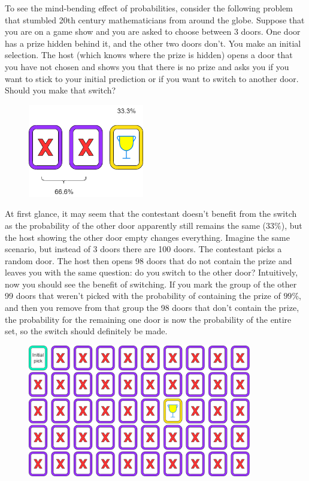 \documentclass[letterpaper]{article}
\begin{document}
To see the mind-bending effect of probabilities, consider the following problem that stumbled 20th century mathematicians from around the globe. Suppose that you are on a game show and you are asked to choose between 3 doors. One door has a prize hidden behind it, and the other two doors don't. You make an initial selection. The host (which knows where the prize is hidden) opens a door that you have not chosen and shows you that there is no prize and asks you if you want to stick to your initial prediction or if you want to switch to another door. Should you make that switch?

\newpage


\begin{figure} [h!]
\centering
\includegraphics[width=0.45\textwidth]{pngOfDiagrams/montyhall3.png}
\end{figure}

At first glance, it may seem that the contestant doesn't benefit from the switch as the probability of the other door apparently still remains the same ($33\%$), but the host showing the other door empty changes everything. Imagine the same scenario, but instead of 3 doors there are 100 doors. The contestant picks a random door. The host then opens 98 doors that do not contain the prize and leaves you with the same question: do you switch to the other door? Intuitively, now you should see the benefit of switching. If you mark the group of the other 99 doors that weren't picked with the probability of containing the prize of $99\%$, and then you remove from that group the 98 doors that don't contain the prize, the probability for the remaining one door is now the probability of the entire set, so the switch should definitely be made. 


\begin{figure} [h!]
\centering
\includegraphics[width=0.87\textwidth]{pngOfDiagrams/montyhall100.png}
\end{figure}
\end{document}
